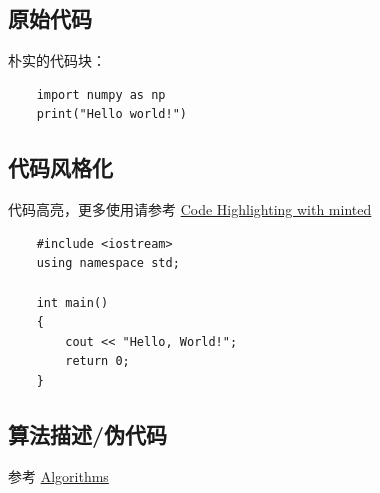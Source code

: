 \documentclass[]{WHUBachelor}
\begin{document}
  \subsection{原始代码}
  朴实的代码块：

  \begin{verbatim}
    import numpy as np
    print("Hello world!")
  \end{verbatim}

  \subsection{代码风格化}
  代码高亮，更多使用请参考 \href{https://www.overleaf.com/learn/latex/Code_Highlighting_with_minted}{Code Highlighting with minted}

  \begin{verbatim}
    #include <iostream>
    using namespace std;

    int main() 
    {
        cout << "Hello, World!";
        return 0;
    }
  \end{verbatim}

  \subsection{算法描述/伪代码}
  参考 \href{https://en.wikibooks.org/wiki/LaTeX/Algorithms}{Algorithms}

\end{document}

